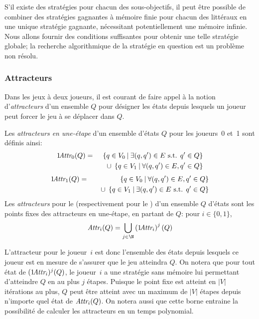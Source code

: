 S'il existe des stratégies pour chacun des sous-objectifs, il peut être possible de combiner des stratégies gagnantes à mémoire finie pour chacun des littéraux en une unique stratégie gagnante, nécessitant potentiellement une mémoire infinie.
Nous allons fournir des conditions suffisantes pour obtenir une telle stratégie globale; la recherche algorithmique de la stratégie en question est un problème non résolu.

\subsubsection{Attracteurs}

Dans les jeux à deux joueurs, il est courant de faire appel à la notion d'\emph{attracteurs} d'un ensemble $Q$ pour désigner les états depuis lesquels un joueur peut forcer le jeu à se déplacer dans $Q$.

\begin{definition}
Les \emph{attracteurs en une-étape} d'un ensemble d'états $Q$ pour les joueurs~0 et~1 sont définis ainsi:
\begin{eqnarray*}
1\!\textit{Attr}_{0}(Q) &=& \left\{q \in V_0 \:\middle|\: \exists (q,q') \in E \textrm{ s.t. } q' \in Q \right\}
\\&&\quad
\cup \;\left\{q \in V_1 \:\middle|\: \forall (q,q') \in E, q' \in Q \right\}
\end{eqnarray*}
\begin{eqnarray*}
1\!\textit{Attr}_{1}(Q) &=& \left\{q \in V_0 \:\middle|\: \forall (q,q') \in E, q' \in Q \right\}
\\&&\quad
\cup \;\left\{q \in V_1 \:\middle|\: \exists (q,q') \in E \textrm{ s.t. } q' \in Q \right\}
\end{eqnarray*}
Les \emph{attracteurs} pour le \jo (respectivement pour le \ji) d'un ensemble $Q$ d'états sont les points fixes des attracteurs en une-étape, en partant de $Q$: pour $i \in \{0,1\}$, \[\attractor{i}(Q) = \bigcup_{j \in \N} \left(1\!\attractor{i}\right)^j(Q)\]
\end{definition}
L'attracteur pour le joueur~$i$ est donc l'ensemble des états depuis lesquels ce joueur est en mesure de s'assurer que le jeu atteindra $Q$.
On notera que pour tout état de $(1\!\textit{Attr}_{i})^j(Q)$, le joueur~$i$ a une stratégie sans mémoire lui permettant d'atteindre $Q$ en au plus $j$ étapes.
Puisque le point fixe est atteint en $|V|$ itérations au plus, $Q$ peut être atteint avec un maximum de $|V|$ étapes depuis n'importe quel état de $\textit{Attr}_{i}(Q)$.
On notera aussi que cette borne entraine la possibilité de calculer les attracteurs en un temps polynomial.

